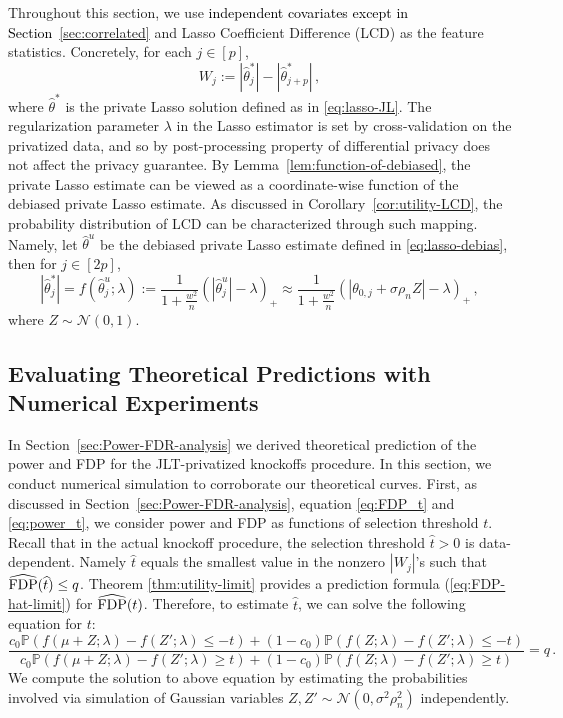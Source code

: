 \documentclass[11pt]{article}
\renewcommand{\hat}{\widehat}
\newcommand{\mcN}{\mathcal{N}}
\newcommand{\FDP}{{\rm FDP}}
\newcommand{\Prob}{\mathbb{P}}
\newcommand{\hth}{\widehat{\theta}}
\newcommand{\wht}{\widehat{t}}
\begin{document}
Throughout this section, we use \textcolor{black}{independent covariates except in Section~\ref{sec:correlated}} and Lasso Coefficient Difference (LCD) as the feature statistics. Concretely, for each $j\in[p]$, 
\[
W_j := |\hth^*_j|-|\hth^*_{j+p}|\,,
\]
where $\hth^*$ is the private Lasso solution defined as in \eqref{eq:lasso-JL}. The regularization parameter $\lambda$ in the Lasso estimator is set by cross-validation on the privatized data, and so by post-processing property of differential privacy does not affect the privacy guarantee. By Lemma~\ref{lem:function-of-debiased}, the private Lasso estimate can be viewed as a coordinate-wise function of the debiased private Lasso estimate. As discussed in Corollary~\ref{cor:utility-LCD}, the probability distribution of LCD can be characterized through such mapping. Namely, let $\hth^u$ be the debiased private Lasso estimate defined in \eqref{eq:lasso-debias}, then for $j\in[2p]$,
\[
|\hth^*_j| = f(\hth^u_j;\lambda):= \frac{1}{1+ \frac{w^2}{n}}\left(|\hth^u_j|-\lambda\right)_+\approx\frac{1}{1+ \frac{w^2}{n}}\left(|\theta_{0,j}+\sigma\rho_nZ|-\lambda\right)_+\,,
\]
where $Z\sim\mcN(0,1)$.

\subsection{Evaluating Theoretical Predictions with Numerical Experiments}\label{sec:thmVsim}
In Section~\ref{sec:Power-FDR-analysis} we derived theoretical prediction of the power and FDP for the JLT-privatized knockoffs procedure. In this section, we conduct numerical simulation to corroborate our theoretical curves. First, as discussed in Section~\ref{sec:Power-FDR-analysis}, equation \eqref{eq:FDP_t} and \eqref{eq:power_t}, we consider power and FDP as functions of selection threshold $t$. 
Recall that in the actual knockoff procedure, the selection threshold $\wht>0$ is data-dependent. Namely $\wht$ equals the smallest value in the nonzero $|W_j|$'s such that $\widehat{\FDP}(\wht)\leq q$. Theorem \ref{thm:utility-limit} provides a prediction formula (\ref{eq:FDP-hat-limit}) for $\widehat{\FDP}(t)$. Therefore, to estimate $\hat t$, we can solve the following equation for $t$:
\begin{equation}\label{eq:solve-t}
    \frac{c_0\Prob(f(\mu+Z;\lambda)-f(Z';\lambda)\leq -t)+(1-c_0)\Prob(f(Z;\lambda)-f(Z';\lambda)\leq -t)}{c_0\Prob(f(\mu+Z;\lambda)-f(Z';\lambda)\geq t)+(1-c_0)\Prob(f(Z;\lambda)-f(Z';\lambda)\geq t)}=q\,.
\end{equation}
We compute the solution to above equation by estimating the probabilities involved via simulation of Gaussian variables $Z, Z'\sim\mcN(0,\sigma^2\rho_n^2)$ independently. 
\end{document}
